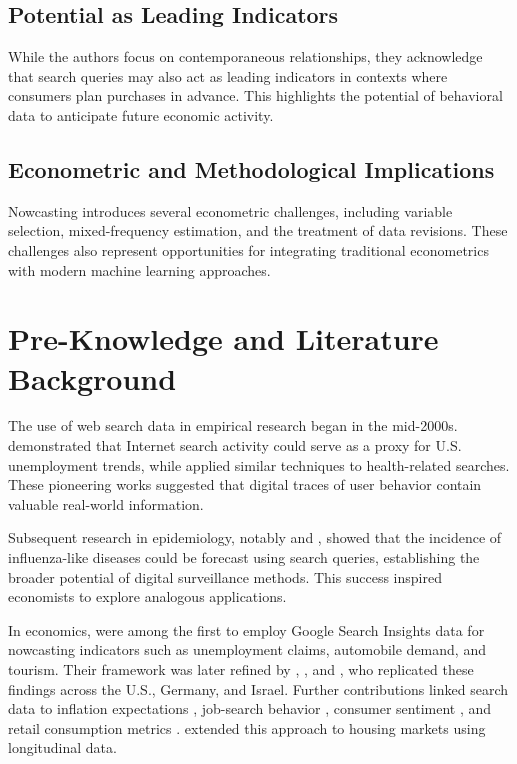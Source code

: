 \documentclass{article}
\begin{document}
\subsection{Potential as Leading Indicators}
While the authors focus on contemporaneous relationships, they acknowledge that search queries may also act as leading indicators in contexts where consumers plan purchases in advance. This highlights the potential of behavioral data to anticipate future economic activity.

\subsection{Econometric and Methodological Implications}
Nowcasting introduces several econometric challenges, including variable selection, mixed-frequency estimation, and the treatment of data revisions. These challenges also represent opportunities for integrating traditional econometrics with modern machine learning approaches.




\section{Pre-Knowledge and Literature Background}

The use of web search data in empirical research began in the mid-2000s. 
\textcite{Ettredge2005} demonstrated that Internet search activity could serve as a proxy for U.S. unemployment trends, while \textcite{Cooper2005} applied similar techniques to health-related searches. 
These pioneering works suggested that digital traces of user behavior contain valuable real-world information.

Subsequent research in epidemiology, notably \textcite{Polgreen2008} and \textcite{Ginsberg2009}, showed that the incidence of influenza-like diseases could be forecast using search queries, establishing the broader potential of digital surveillance methods. 
This success inspired economists to explore analogous applications.

In economics, \textcite{Choi2009a,Choi2009b} were among the first to employ Google Search Insights data for nowcasting indicators such as unemployment claims, automobile demand, and tourism. 
Their framework was later refined by \textcite{Askitas2010}, \textcite{DAmuri2010}, and \textcite{Suhoy2009}, who replicated these findings across the U.S., Germany, and Israel. 
Further contributions linked search data to inflation expectations \parencite{Guzman2011}, job-search behavior \parencite{Baker2011}, consumer sentiment \parencite{Radinsky2009,Huang2009,Preis2010}, and retail consumption metrics \parencite{Schmidt2009,Lindberg2011}. 
\textcite{Wu2010} extended this approach to housing markets using longitudinal data.
\end{document}
